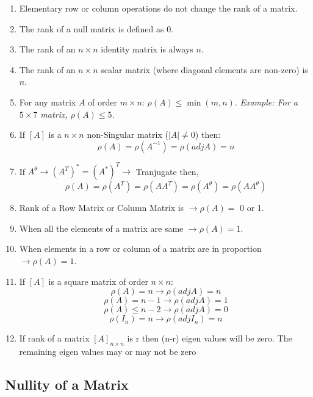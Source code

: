 \begin{enumerate}
    \item Elementary row or column operations do not change the rank of a matrix.

    \item The rank of a null matrix is defined as $0$.

    \item The rank of an $n \times n$ identity matrix is always $n$.

    \item The rank of an $n \times n$ scalar matrix (where diagonal elements are non-zero) is $n$.

    \item For any matrix $A$ of order $m \times n$: $\rho(A) \leq \min(m, n)$.
    \textit{Example: For a $5 \times 7$ matrix, $\rho(A) \leq 5$.}

    \item If $[A]$ is a $n \times n$ non-Singular matrix ($|A| \neq 0$) then:
    $$ \rho (A) = \rho (A^{-1}) = \rho (adj A) = n$$

    \item If $A^{\theta} \longrightarrow (A^T)^* = (A^*)^T \longrightarrow $ Tranjugate then,
    $$ \rho (A) = \rho (A^T) = \rho (AA^T) = \rho (A^\theta) = \rho (AA^\theta) $$

    \item Rank of a Row Matrix or Column Matrix is $\longrightarrow \rho (A) =$ 0  or 1.

    \item When all the elements of a matrix are same $\longrightarrow \rho (A) = 1$.

    \item When elements in a row or column of a matrix are in proportion $\longrightarrow \rho (A) = 1$.

    \item If $[A]$ is a square matrix of order $n \times n$:
    $$ \rho (A) = n \longrightarrow \rho(adj A) = n $$
    $$ \rho (A) = n-1 \longrightarrow \rho(adj A) = 1 $$
    $$ \rho (A) \leq n-2 \longrightarrow \rho(adj A) = 0 $$
    $$ \rho (I_n) = n \longrightarrow \rho(adj I_n) = n $$

    \item If rank of a matrix $[A]_{n \times n}$ is r then (n-r) eigen values will be zero. The remaining eigen values may or may not be zero
\end{enumerate}

\subsection{Nullity of a Matrix}

